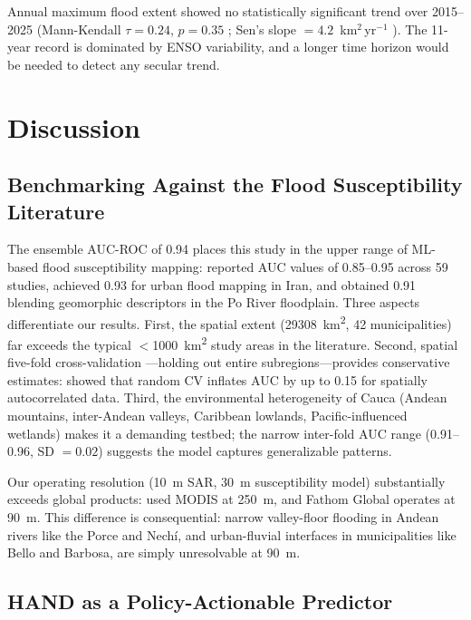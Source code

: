 \documentclass{article}
\begin{document}
Annual maximum flood extent showed no statistically significant trend over 2015--2025 (Mann-Kendall $\tau = 0.24$, $p = 0.35$ \citep{Mann1945}; Sen's slope $= 4.2$~km$^2$\,yr$^{-1}$ \citep{Sen1968}). The 11-year record is dominated by ENSO variability, and a longer time horizon would be needed to detect any secular trend.

\section{Discussion}
\label{sec:discussion}

\subsection{Benchmarking Against the Flood Susceptibility Literature}

The ensemble AUC-ROC of 0.94 places this study in the upper range of ML-based flood susceptibility mapping: \citet{Mosavi2018} reported AUC values of 0.85--0.95 across 59 studies, \citet{Darabi2021} achieved 0.93 for urban flood mapping in Iran, and \citet{Magnini2022} obtained 0.91 blending geomorphic descriptors in the Po River floodplain. Three aspects differentiate our results. First, the spatial extent (\SI{29308}{\kilo\metre\squared}, 42 municipalities) far exceeds the typical $<$\SI{1000}{\kilo\metre\squared} study areas in the literature. Second, spatial five-fold cross-validation \citep{Roberts2017}---holding out entire subregions---provides conservative estimates: \citet{Roberts2017} showed that random CV inflates AUC by up to 0.15 for spatially autocorrelated data. Third, the environmental heterogeneity of Cauca (Andean mountains, inter-Andean valleys, Caribbean lowlands, Pacific-influenced wetlands) makes it a demanding testbed; the narrow inter-fold AUC range (0.91--0.96, SD $= 0.02$) suggests the model captures generalizable patterns.

Our operating resolution (\SI{10}{\metre} SAR, \SI{30}{\metre} susceptibility model) substantially exceeds global products: \citet{Tellman2021} used MODIS at \SI{250}{\metre}, and Fathom Global operates at \SI{90}{\metre}. This difference is consequential: narrow valley-floor flooding in Andean rivers like the Porce and Nech\'i, and urban-fluvial interfaces in municipalities like Bello and Barbosa, are simply unresolvable at \SI{90}{\metre}.

\subsection{HAND as a Policy-Actionable Predictor}
\end{document}
